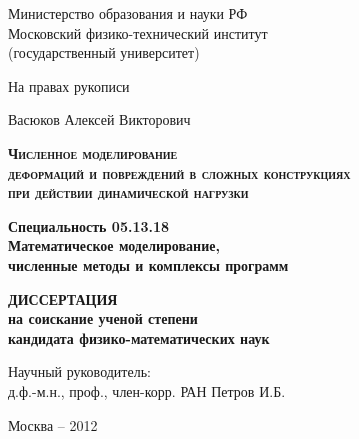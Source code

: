 \begin{titlepage}
\newpage

\begin{center}
Министерство образования и науки РФ\\
Московский физико-технический институт\\
(государственный университет)\\
\end{center}

\vspace{0.5em}

\begin{flushright}
На правах рукописи
\end{flushright}

\vspace{2em}

\begin{center}
Васюков Алексей Викторович
\end{center}

\vspace{2em}

\begin{center}
\textsc{\textbf{Численное моделирование\\
деформаций и повреждений в сложных конструкциях\\
при действии динамической нагрузки}}
\end{center}

\vspace{0.5em}

\begin{center}
\textbf{Специальность 05.13.18\\
Математическое моделирование,\\
численные методы и комплексы программ}
\end{center}

\vspace{0.5em}

\begin{center}
\textbf{ДИССЕРТАЦИЯ\\
на соискание ученой степени\\
кандидата физико-математических наук}
\end{center}

\vspace{2em}

\begin{flushright}
\vspace{1.5em}
Научный руководитель:\\
д.ф.-м.н., проф., член-корр. РАН Петров И.Б.
\end{flushright}

\vspace{\fill}
\begin{center}
Москва -- 2012
\end{center}

\end{titlepage}
